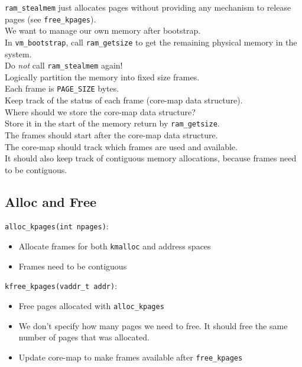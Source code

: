 \documentclass[12pt]{article}
\theoremstyle{plain}
\theoremstyle{definition}
\begin{document}
\texttt{ram\_stealmem} just allocates pages without providing any mechanism to release pages (see \texttt{free\_kpages}). \\

We want to manage our own memory after bootstrap. \\

In \texttt{vm\_bootstrap}, call \texttt{ram\_getsize} to get the remaining physical memory in the system. \\
Do \emph{not} call \texttt{ram\_stealmem} again! \\

Logically partition the memory into fixed size frames. \\
Each frame is \texttt{PAGE\_SIZE} bytes. \\

Keep track of the status of each frame (core-map data structure). \\

Where should we store the core-map data structure? \\
Store it in the start of the memory return by \texttt{ram\_getsize}. \\
The frames should start after the core-map data structure. \\
The core-map should track which frames are used and available. \\
It should also keep track of contiguous memory allocations, because frames need to be contiguous.

\subsection{Alloc and Free}
\texttt{alloc\_kpages(int npages)}:
\begin{itemize}
  \item Allocate frames for both \texttt{kmalloc} and address spaces
  \item Frames need to be contiguous
\end{itemize}

\texttt{kfree\_kpages(vaddr\_t addr)}:
\begin{itemize}
  \item Free pages allocated with \texttt{alloc\_kpages}
  \item We don't specify how many pages we need to free.
  It should free the same number of pages that was allocated.
  \item Update core-map to make frames available after \texttt{free\_kpages}
\end{itemize}
\end{document}
